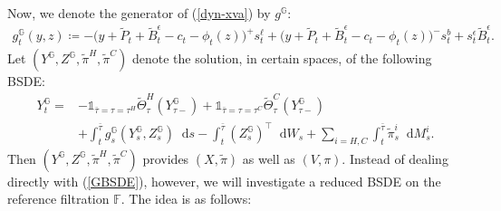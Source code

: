 \documentclass[a4paper, 11pt]{article}              %
\numberwithin{equation}{section}
\theoremstyle{plain}
\newcommand{\btau}{\bar{\tau}}
\newcommand{\1}{\mathds{1}}
\newcommand{\Bt}{\tilde{B}}
\newcommand{\pt}{\tilde{P}}
\newcommand{\pit}{\tilde{\pi}}
\newcommand{\dsF}{\mathbb{F}}
\newcommand{\dsG}{\mathbb{G}}
\newcommand{\Jt}{\tilde{\Theta}}
\newcommand{\SUM}{\displaystyle\sum}
\theoremstyle{plain}
\theoremstyle{definition}
\newtheorem{remark}[thm]{Remark} %
\theoremstyle{plain}
\newtheorem{remark}{Remark}
\newcommand*\df{\mathop{}\!\mathrm{d}}
\begin{document}
\iffalse
\begin{remark}\label{remark:repo}
  Note that we do not exclude the convention commonly used in the literature
  that  
  assets are traded from repo markets, i.e., $I = \rho$. In this case, we can set
  $\alpha =0$ in \Cref{assm:generator}.
\end{remark}
\fi
Now, we denote the generator of (\ref{dyn-xva}) by $g^\dsG$:
\begin{align}
  g^{\dsG}_t(y, z) \coloneqq
  -\big(y + \pt_t +\Bt^\epsilon_t- c_t - \phi_t(z)\big)^{+}s^{\ell}_t
  +\big(y + \pt_t +\Bt^\epsilon_t- c_t - \phi_t(z)\big)^{-}s^{b}_t +s^\epsilon_t\Bt^\epsilon_t. \nonumber 
\end{align}
Let $(Y^{\dsG}, Z^{\dsG}, \pit^H, \pit^C)$ denote the solution, in  certain
spaces, of the following BSDE:
\begin{align}
  Y^{\dsG}_t =&-\1_{\btau=\tau=\tau^H}\Jt^{H}_{\tau}(Y^{\dsG}_{\tau-})
                +\1_{\btau=\tau=\tau^C}\Jt^{C}_{\tau}(Y^{\dsG}_{\tau-})
                \nonumber\\
              &  +\int_{t}^{\btau}g^{\dsG}_s( Y^{\dsG}_s, Z^{\dsG}_s) \df s
                - \int_{t}^{\btau}(Z^{\dsG}_s)^{\top}\df W_s
                +\SUM_{i =H, C}\int_{t}^{\btau} \tilde{\pi}^i_s\df M^i_s. \label{GBSDE}
\end{align}
Then $(Y^{\dsG}, Z^{\dsG}, \pit^H, \pit^C)$ provides $(X, \pit)$ as well as
$(V, \pi)$. Instead of dealing directly with (\ref{GBSDE}), however, we will
investigate a reduced BSDE on the reference filtration $\dsF$. The idea is as
follows:
\end{document}
